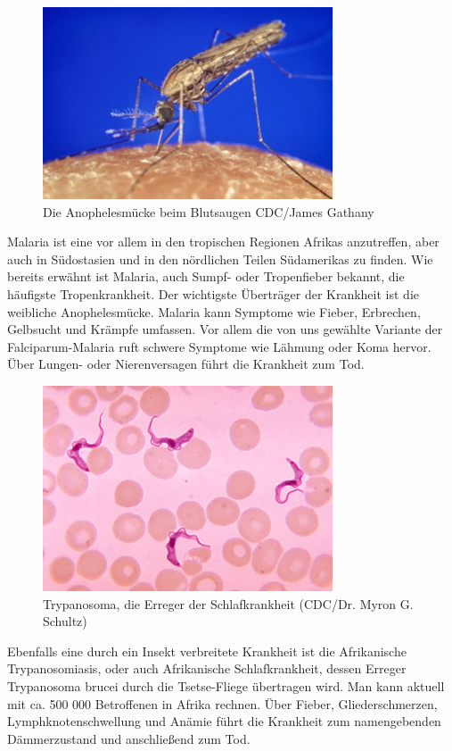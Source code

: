 \documentclass[11pt]{article}
\begin{document}
        \begin{figure}
            \includegraphics[width=\linewidth]{Anophelesmucke}
            \caption{Die Anophelesmücke beim Blutsaugen CDC/James Gathany}
        \end{figure}
        Malaria ist eine vor allem in den tropischen Regionen Afrikas anzutreffen, aber auch in Südostasien und in den nördlichen Teilen Südamerikas zu finden. Wie bereits erwähnt ist Malaria, auch Sumpf- oder Tropenfieber bekannt, die häufigste Tropenkrankheit. Der wichtigste Überträger der Krankheit ist die weibliche Anophelesmücke. Malaria kann Symptome wie Fieber, Erbrechen, Gelbsucht und Krämpfe umfassen. Vor allem die von uns gewählte Variante der Falciparum-Malaria ruft schwere Symptome wie Lähmung oder Koma hervor. Über Lungen- oder Nierenversagen führt die Krankheit zum Tod.

        \begin{figure}
            \includegraphics[width=\linewidth]{Trypanosoma}
            \caption{Trypanosoma, die Erreger der Schlafkrankheit (CDC/Dr. Myron G. Schultz)}
        \end{figure}
        Ebenfalls eine durch ein Insekt verbreitete Krankheit ist die Afrikanische Trypanosomiasis, oder auch Afrikanische Schlafkrankheit, dessen Erreger Trypanosoma brucei durch die Tsetse-Fliege übertragen wird. Man kann aktuell mit ca. 500 000 Betroffenen in Afrika rechnen. Über Fieber, Gliederschmerzen, Lymphknotenschwellung und Anämie führt die Krankheit zum namengebenden Dämmerzustand und anschließend zum Tod.
\end{document}
